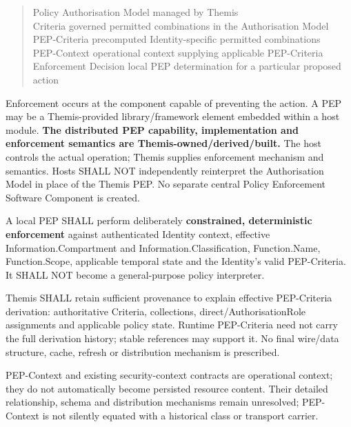 \begin{quote}\small\ttfamily
Policy                Authorisation Model managed by Themis\\
Criteria              governed permitted combinations in the Authorisation Model\\
PEP-Criteria          precomputed Identity-specific permitted combinations\\
PEP-Context           operational context supplying applicable PEP-Criteria\\
Enforcement Decision  local PEP determination for a particular proposed action\\

\end{quote}


Enforcement occurs at the component capable of preventing the action. A PEP may
be a Themis-provided library/framework element embedded within a host module.
\textbf{The distributed PEP capability, implementation and enforcement semantics are
Themis-owned/derived/built.} The host controls the actual operation; Themis
supplies enforcement mechanism and semantics. Hosts SHALL NOT independently
reinterpret the Authorisation Model in place of the Themis PEP. No separate
central Policy Enforcement Software Component is created.



A local PEP SHALL perform deliberately \textbf{constrained, deterministic enforcement}
against authenticated Identity context, effective Information.Compartment and
Information.Classification, Function.Name, Function.Scope, applicable temporal
state and the Identity's valid PEP-Criteria. It SHALL NOT become a general-purpose
policy interpreter.



Themis SHALL retain sufficient provenance to explain effective PEP-Criteria
derivation: authoritative Criteria, collections, direct/AuthorisationRole
assignments and applicable policy state. Runtime PEP-Criteria need not carry
the full derivation history; stable references may support it. No final wire/data
structure, cache, refresh or distribution mechanism is prescribed.



PEP-Context and existing security-context contracts are operational context;
they do not automatically become persisted resource content. Their detailed
relationship, schema and distribution mechanisms remain unresolved;
PEP-Context is not silently equated with a historical class or transport carrier.


